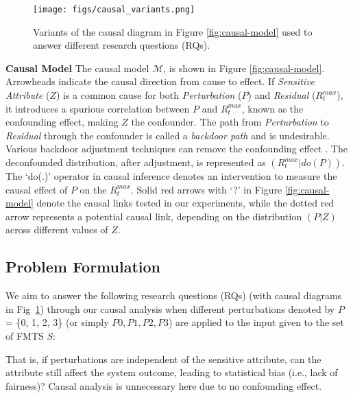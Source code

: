 \begin{figure}[!h]
    \centering
    \texttt{[image: figs/causal\_variants.png]}
    \caption{Variants of the causal diagram in Figure \ref{fig:causal-model} used to answer different research questions (RQs).}
   \label{fig:cms}
   \vspace{-1em}
\end{figure}

\noindent \textbf{Causal Model} The causal model \( \mathcal{M} \), is shown in Figure \ref{fig:causal-model}. Arrowheads indicate the causal direction from cause to effect. If \emph{Sensitive Attribute} ($Z$) is a common cause for both \emph{Perturbation} ($P$) and \emph{Residual} ($R^{max}_{t}$), it introduces a spurious correlation between $P$ and $R^{max}_{t}$, known as the confounding effect, making $Z$ the confounder. The path from \emph{Perturbation} to \emph{Residual} through the confounder is called a \textit{backdoor path} and is undesirable. Various backdoor adjustment techniques can remove the confounding effect \cite{xu2022neural, fang2024backdoor, liu2021preferences}. The deconfounded distribution, after adjustment, is represented as $(R^{max}_{t} | do(P))$. The `do(.)' operator in causal inference denotes an intervention to measure the causal effect of $P$ on the $R^{max}_{t}$. Solid red arrows with `?' in Figure \ref{fig:causal-model} denote the causal links tested in our experiments, while the dotted red arrow represents a potential causal link, depending on the distribution $(P | Z)$ across different values of $Z$.

\subsection{Problem Formulation}
We aim to answer the following research questions (RQs) (with causal diagrams in Fig~\ref{fig:cms}) through our causal analysis when different perturbations denoted by $P$ = \{0, 1, 2, 3\} (or simply $P0, P1, P2, P3$) are applied to the input given to the set of FMTS $S$:

 That is, if perturbations are independent of the sensitive attribute, can the attribute still affect the system outcome, leading to statistical bias (i.e., lack of fairness)? Causal analysis is unnecessary here due to no confounding effect.


